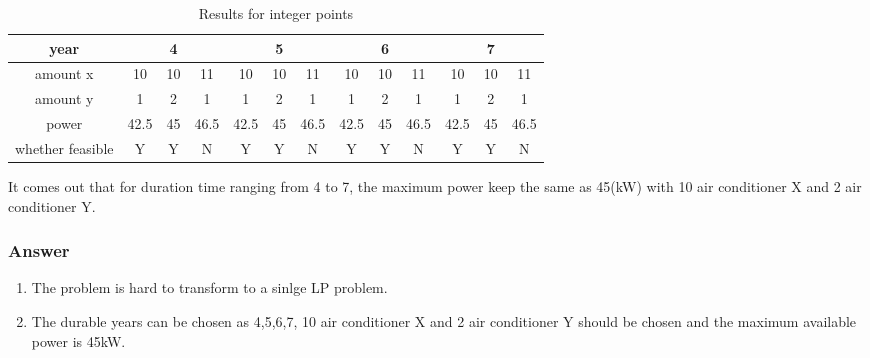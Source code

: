 \documentclass[titlepage,a4paper]{article}
\begin{document}
        \begin{table}[H]
            \centering
        
            \begin{tabular}{c|ccc|ccc|ccc|ccc}
                \hline
                year             & \multicolumn{3}{c|}{4} & \multicolumn{3}{c|}{5} & \multicolumn{3}{c|}{6} & \multicolumn{3}{c}{7} \\ \hline
                amount x         & 10     & 10   & 11     & 10     & 10   & 11     & 10     & 10   & 11     & 10     & 10   & 11    \\
                amount y         & 1      & 2    & 1      & 1      & 2    & 1      & 1      & 2    & 1      & 1      & 2    & 1     \\
                power            & 42.5   & 45   & 46.5   & 42.5   & 45   & 46.5   & 42.5   & 45   & 46.5   & 42.5   & 45   & 46.5  \\ \hline
                whether feasible & Y      & Y    & N      & Y      & Y    & N      & Y      & Y    & N      & Y      & Y    & N     \\ \hline
            \end{tabular}

            \caption{Results for integer points}

        \end{table}

        It comes out that for duration time ranging from 4 to 7, the maximum power keep the same as 45(kW) with 10 air conditioner X and 2 air conditioner Y.        

        \subsubsection{Answer}
        \begin{enumerate}
            \item The problem is hard to transform to a sinlge LP problem.
            \item The durable years can be chosen as 4,5,6,7, 10 air conditioner X and 2 air conditioner Y should be chosen and the maximum available power is 45kW.
        \end{enumerate}

\ifx \allfiles \undefined    
\end{document}
